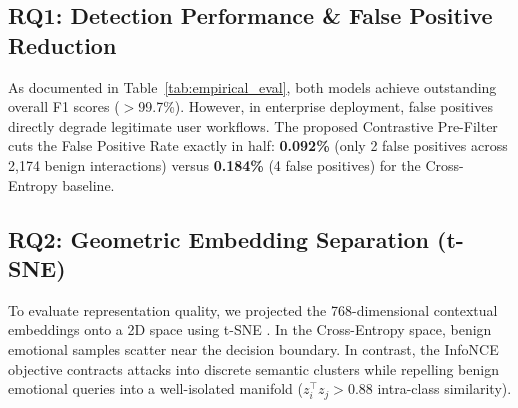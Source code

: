 \documentclass[journal]{IEEEtran}
\begin{document}
\begin{table}[t]
\caption{Empirical Model Comparison on the Test Benchmark ($N = 4,123$ Total Samples)}
\label{tab:empirical_eval}
\centering
{}
\end{table}

\subsection{RQ1: Detection Performance \& False Positive Reduction}
As documented in Table~\ref{tab:empirical_eval}, both models achieve outstanding overall F1 scores ($>$99.7\%). However, in enterprise deployment, false positives directly degrade legitimate user workflows. The proposed Contrastive Pre-Filter cuts the False Positive Rate exactly in half: \textbf{0.092\%} (only 2 false positives across 2,174 benign interactions) versus \textbf{0.184\%} (4 false positives) for the Cross-Entropy baseline.

\subsection{RQ2: Geometric Embedding Separation (t-SNE)}
To evaluate representation quality, we projected the 768-dimensional contextual embeddings onto a 2D space using t-SNE \cite{vandermaaten2008visualizing}. In the Cross-Entropy space, benign emotional samples scatter near the decision boundary. In contrast, the InfoNCE objective contracts attacks into discrete semantic clusters while repelling benign emotional queries into a well-isolated manifold ($z_i^\top z_j > 0.88$ intra-class similarity).
\end{document}
